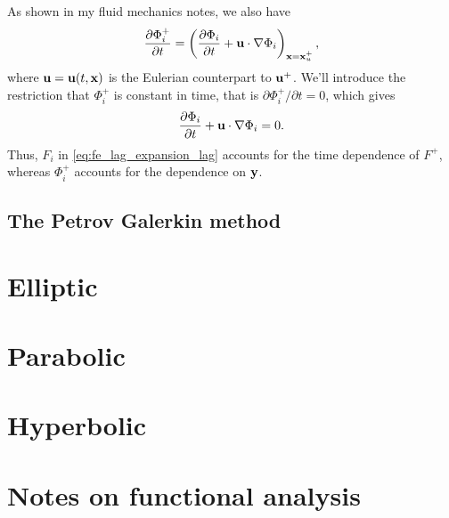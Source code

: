 \documentclass[oneside,a4paper,11pt]{report}
\begin{document}
As shown in my fluid mechanics notes, we also have
\begin{equation}
    \label{eq:fe_lag_deriv_correspondence}
    \frac{\partial \Phi_i^+}{\partial t} = \left ( \frac{\partial \Phi_i}{\partial t} + \mathbf{u} \cdot \nabla \Phi_i \right )_{\mathbf{x} = \mathbf{x}_u^+},
\end{equation}
where $\mathbf{u} = \mathbf{u}(t,\mathbf{x})$ is the Eulerian counterpart to $\mathbf{u}^+$. We'll introduce the restriction that $\Phi_i^+$ is constant in time, that is $\partial \Phi_i^+/\partial t = 0$, which gives
\begin{equation}
    \frac{\partial \Phi_i}{\partial t} + \mathbf{u} \cdot \nabla \Phi_i = 0.
\end{equation}
Thus, $F_i$ in \cref{eq:fe_lag_expansion_lag} accounts for the time dependence of $F^+$, whereas $\Phi_i^+$ accounts for the dependence on $\mathbf{y}$.

\section{The Petrov Galerkin method}

\chapter{Elliptic}

\chapter{Parabolic}

\chapter{Hyperbolic}

\appendix

\chapter{Notes on functional analysis}
\end{document}
